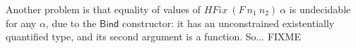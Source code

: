 \documentclass{llncs}
\begin{document}
Another problem is that equality of values of
$\mathit{HFix}~(F~n_1~n_2)~\alpha$ is undecidable for any $\alpha$,
due to the $\mathsf{Bind}$ constructor: it has an unconstrained
existentially quantified type, and its second argument is a function.
So... FIXME






\end{document}
